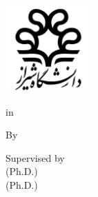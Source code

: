 \begin{titlepage}
    \begin{latin}
        \centering\bfseries
        \includegraphics[width=0.25\textwidth]{assets/shiraz_university_logo}

        {\LatinUniversity}

        \vspace{\baselineskip}
        {\large \LatinSchool}

        {\large {\LatinDegreeAbbr} {\LatinType} in \\ {\LatinField}}

        \vspace{3\baselineskip}
        {\Large \LatinTitle}

        \vspace{3\baselineskip}
        By \\
        {\large \LatinName}

        \vspace{2\baselineskip}
        Supervised by \\
        {\large {\LatinSupervisor} (Ph.D.) \\ {\LatinSupervisorB} (Ph.D.)}

        \vspace{\baselineskip}
        {\large \LatinDate}
    \end{latin}
\end{titlepage}
